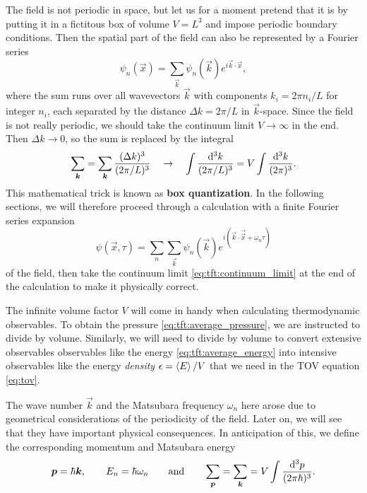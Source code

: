 The field is not periodic in space, but let us for a moment pretend that it is by putting it in a fictitous box of volume $V = L^3$ and impose periodic boundary conditions.
Then the spatial part of the field can also be represented by a Fourier series
\begin{equation}
	\psi_n(\vec{x}) = \sum_\vec{k} \psi_n(\vec{k}) e^{i \vec{k} \cdot \vec{x}} ,
\end{equation}
where the sum runs over all wavevectors $\vec{k}$ with components $k_i = 2 \pi n_i / L$ for integer $n_i$, each separated by the distance $\Delta k = 2 \pi / L$ in $\vec{k}$-space.
Since the field is not really periodic, we should take the continuum limit $V \rightarrow \infty$ in the end.
Then $\Delta k \rightarrow 0$, so the sum is replaced by the integral
\begin{equation}
	\sum_{\bm{k}} = 
	\sum_{\bm{k}} \frac{(\Delta k)^3}{(2 \pi / L)^3} 
	\quad \rightarrow  \quad
	\int \frac{\mathop{}\!\mathrm{d}^3 k}{(2 \pi / L)^3} =
	V \int \frac{\mathop{}\!\mathrm{d}^3 k}{(2 \pi)^3} .
\label{eq:tft:continuum_limit}
\end{equation}
This mathematical trick is known as \textbf{box quantization}.
In the following sections, we will therefore proceed through a calculation with a finite Fourier series expansion
\begin{equation}
	\psi(\vec{x}, \tau) = \sum_n \sum_\vec{k} \psi_n(\vec{k}) e^{i (\vec{k} \cdot \vec{\vec{x}} + \omega_n \tau)}
\label{eq:tft:fourier_series}
\end{equation}
of the field, then take the continuum limit \eqref{eq:tft:continuum_limit} at the end of the calculation to make it physically correct.

The infinite volume factor $V$ will come in handy when calculating thermodynamic observables.
To obtain the pressure \eqref{eq:tft:average_pressure}, we are instructed to divide by volume.
Similarly, we will need to divide by volume to convert extensive observables observables like the energy \eqref{eq:tft:average_energy} into intensive observables like the energy \emph{density} $\epsilon = \left< E \right> / V$ that we need in the TOV equation \eqref{eq:tov}.

The wave number $\vec{k}$ and the Matsubara frequency $\omega_n$ here arose due to geometrical considerations of the periodicity of the field.
Later on, we will see that they have important physical consequences.
In anticipation of this, we define the corresponding momentum and Matsubara energy
\begin{equation}
	{\bm{p}} = \hbar {\bm{k}}, \qquad
	E_n = \hbar \omega_n \qquad \text{and} \qquad
	\sum_{\bm{p}} = \sum_{\bm{k}} = V \int \frac{\mathop{}\!\mathrm{d}^3 p}{(2 \pi \hbar)^3}.
\label{eq:tft:matsubara_energies}
\end{equation}

